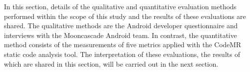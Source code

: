 In this section, details of the qualitative and quantitative evaluation methods performed within the scope of this study and the results of these evaluations are shared. The qualitative methods are the Android developer questionnaire and interviews with the Mooncascade Android team. In contrast, the quantitative method consists of the measurements of five metrics applied with the CodeMR static code analysis tool. The interpretation of these evaluations, the results of which are shared in this section, will be carried out in the next section.